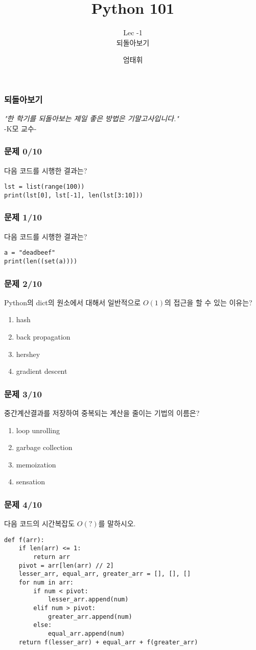 \documentclass{beamer}
\title{Python 101}
\subtitle{Lec -1\\ 되돌아보기}
\author{엄태휘}
\begin{document}
\frame{\titlepage}

\begin{frame}
\frametitle{되돌아보기}
\textit{"한 학기를 되돌아보는 제일 좋은 방법은 기말고사입니다."}\\
-K모 교수-
\end{frame}

\begin{frame}[fragile]
\frametitle{문제 0/10}
다음 코드를 시행한 결과는?
\begin{lstlisting}
lst = list(range(100))
print(lst[0], lst[-1], len(lst[3:10]))
\end{lstlisting}
\end{frame}

\begin{frame}[fragile]
\frametitle{문제 1/10}
다음 코드를 시행한 결과는?
\begin{lstlisting}
a = "deadbeef"
print(len((set(a))))
\end{lstlisting}
\end{frame}

\begin{frame}[fragile]
\frametitle{문제 2/10}
Python의 dict의 원소에서 대해서 일반적으로 $O(1)$의 접근을 할 수 있는 이유는?
\begin{enumerate}
  \item hash
  \item back propagation
  \item hershey
  \item gradient descent
\end{enumerate}
\end{frame}

\begin{frame}[fragile]
\frametitle{문제 3/10}
중간계산결과를 저장하여 중복되는 계산을 줄이는 기법의 이름은?
\begin{enumerate}
  \item loop unrolling
  \item garbage collection
  \item memoization
  \item sensation
\end{enumerate}
\end{frame}

\begin{frame}[fragile]
\frametitle{문제 4/10}
다음 코드의 시간복잡도 $O(?)$를 말하시오.
\begin{lstlisting}
def f(arr):
    if len(arr) <= 1:
        return arr
    pivot = arr[len(arr) // 2]
    lesser_arr, equal_arr, greater_arr = [], [], []
    for num in arr:
        if num < pivot:
            lesser_arr.append(num)
        elif num > pivot:
            greater_arr.append(num)
        else:
            equal_arr.append(num)
    return f(lesser_arr) + equal_arr + f(greater_arr)
\end{lstlisting}
\end{frame}
\end{document}
